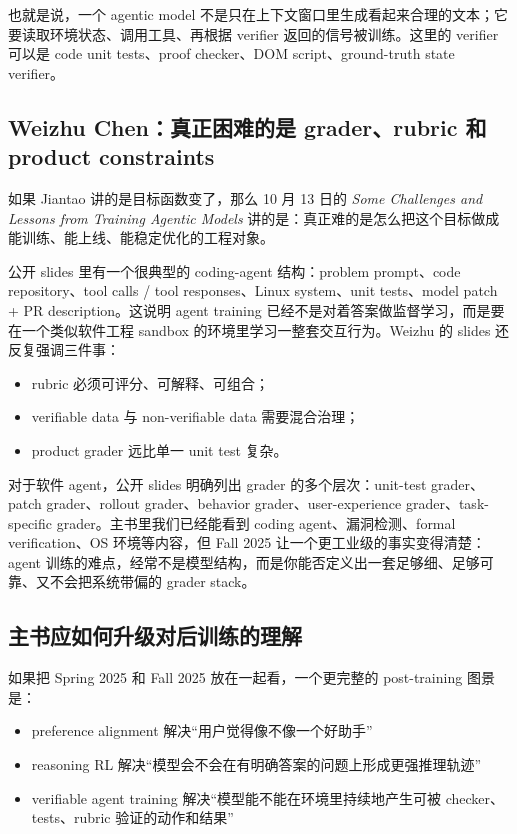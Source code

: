 \documentclass[11pt]{ctexbook}
\begin{document}
也就是说，一个 agentic model 不是只在上下文窗口里生成看起来合理的文本；它要读取环境状态、调用工具、再根据 verifier 返回的信号被训练。这里的 verifier 可以是 code unit tests、proof checker、DOM script、ground-truth state verifier。

\subsection{Weizhu Chen：真正困难的是 grader、rubric 和 product constraints}

如果 Jiantao 讲的是目标函数变了，那么 10 月 13 日的 \emph{Some Challenges and Lessons from Training Agentic Models} 讲的是：真正难的是怎么把这个目标做成能训练、能上线、能稳定优化的工程对象。

公开 slides 里有一个很典型的 coding-agent 结构：problem prompt、code repository、tool calls / tool responses、Linux system、unit tests、model patch + PR description。这说明 agent training 已经不是对着答案做监督学习，而是要在一个类似软件工程 sandbox 的环境里学习一整套交互行为。Weizhu 的 slides 还反复强调三件事：

\begin{itemize}
\item rubric 必须可评分、可解释、可组合；
\item verifiable data 与 non-verifiable data 需要混合治理；
\item product grader 远比单一 unit test 复杂。
\end{itemize}

对于软件 agent，公开 slides 明确列出 grader 的多个层次：unit-test grader、patch grader、rollout grader、behavior grader、user-experience grader、task-specific grader。主书里我们已经能看到 coding agent、漏洞检测、formal verification、OS 环境等内容，但 Fall 2025 让一个更工业级的事实变得清楚：agent 训练的难点，经常不是模型结构，而是你能否定义出一套足够细、足够可靠、又不会把系统带偏的 grader stack。

\subsection{主书应如何升级对后训练的理解}

如果把 Spring 2025 和 Fall 2025 放在一起看，一个更完整的 post-training 图景是：

\begin{itemize}
\item preference alignment 解决“用户觉得像不像一个好助手”
\item reasoning RL 解决“模型会不会在有明确答案的问题上形成更强推理轨迹”
\item verifiable agent training 解决“模型能不能在环境里持续地产生可被 checker、tests、rubric 验证的动作和结果”
\end{itemize}
\end{document}
